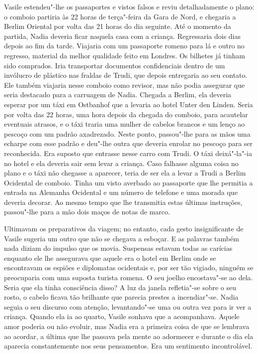 Vasile estendeu"-lhe os passaportes e vistos falsos e reviu
detalhadamente o plano: o comboio partiria às 22 horas de terça"-feira da
Gara de Nord, e chegaria a Berlim Oriental por volta das 21 horas do
dia seguinte. Até o momento da partida, Nadia deveria ficar naquela
casa com a criança. Regressaria dois dias depois ao fim da tarde.
Viajaria com um passaporte romeno para lá e outro no regresso, material da melhor qualidade feito em Londres. Os bilhetes já tinham sido
comprados. Iria transportar documentos confidenciais dentro de um
invólucro de plástico nas fraldas de Trudi, que depois entregaria ao
seu contato. Ele também viajaria nesse comboio como revisor, mas não
podia assegurar que seria destacado para a carruagem de Nadia. Chegada a
Berlim, ela deveria esperar por um táxi em Ostbanhof que a levaria ao
hotel Unter den Linden. Seria por volta das 22 horas, uma hora depois da
chegada do comboio, para acautelar eventuais atrasos, e o táxi traria
uma mulher de cabelos brancos e um lenço ao pescoço com um padrão
axadrezado. Neste ponto, passou"-lhe para as mãos uma echarpe com esse
padrão e deu"-lhe outra que deveria enrolar no pescoço para ser
reconhecida. Era suposto que entrasse nesse carro com Trudi. O táxi
deixá"-la"-ia no hotel e ela deveria sair sem levar a criança. Caso
falhasse alguma coisa no plano e o táxi não chegasse a aparecer, teria
de ser ela a levar a Trudi a Berlim Ocidental de comboio. Tinha um
visto averbado ao passaporte que lhe permitia a entrada na Alemanha
Ocidental e um número de telefone e uma morada que deveria decorar. Ao
mesmo tempo que lhe transmitia estas últimas instruções, passou"-lhe para
a mão dois maços de notas de marco.

Ultimavam os preparativos da viagem; no entanto, cada gesto
insignificante de Vasile sugeria um outro que não se chegava a esboçar.
E as palavras também nada diziam do impulso que os movia. Suspensas
estavam todas as carícias enquanto ele lhe assegurava que aquele era o
hotel em Berlim onde se encontravam os espiões e diplomatas ocidentais
e, por ser tão vigiado, ninguém se preocuparia com uma suposta turista
romena. O seu joelho encostava"-se ao dela. Seria que ela tinha %
consciência disso? A luz da janela refletia"-se sobre o seu rosto, o
cabelo ficava tão brilhante que parecia prestes a incendiar"-se. Nadia
seguia o seu discurso com atenção, levantando"-se uma ou outra vez para
ir ver a criança. Quando ela ia ao quarto, Vasile sonhava que a
acompanhava. Aquele amor poderia ou não evoluir, mas Nadia era a
primeira coisa de que se lembrava ao acordar, a última que lhe passava
pela mente ao adormecer e durante o dia ela aparecia constantemente
nos seus pensamentos. Era um sentimento incontrolável.

